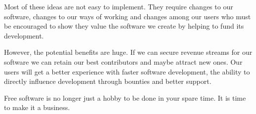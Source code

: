 Most of these ideas are not easy to implement. They require changes to our
software, changes to our ways of working and changes among our users who must be
encouraged to show they value the software we create by helping to fund its
development.

However, the potential benefits are huge. If we can secure revenue streams for
our software we can retain our best contributors and maybe attract new ones. Our
users will get a better experience with faster software development, the ability
to directly influence development through bounties and better support.

Free software is no longer just a hobby to be done in your spare time. It is
time to make it a business.
